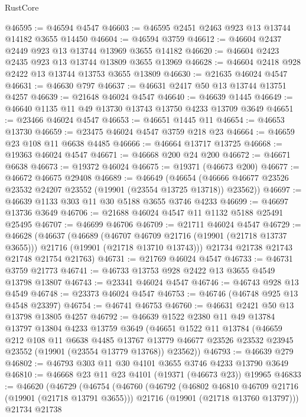 \begin{lexlean}{RustCore}
\begin{coremodule}
@46595 := @46594 @4547
@46603 := @46595 @2451 @2463 @923 @13 @13744 @14182 @3655 @14450
@46604 := @46594 @3759
@46612 := @46604 @2437 @2449 @923 @13 @13744 @13969 @3655 @14182
@46620 := @46604 @2423 @2435 @923 @13 @13744 @13809 @3655 @13969
@46628 := @46604 @2418 @928 @2422 @13 @13744 @13753 @3655 @13809
@46630 := @21635 @46024 @4547
@46631 := @46630 @797
@46637 := @46631 @2417 @50 @13 @13744 @13751 @4257
@46639 := @21648 @46024 @4547
@46640 := @46639 @1445
@46649 := @46640 @1135 @11 @49 @13730 @13743 @13750 @4233 @13709 @3649
@46651 := @23466 @46024 @4547
@46653 := @46651 @1445 @11
@46654 := @46653 @13730
@46659 := @23475 @46024 @4547 @3759 @218 @23
@46664 := @46659 @23 @108 @11 @6638 @4485
@46666 := @46664 @13717 @13725
@46668 := @19363 @46024 @4547
@46671 := @46668 @200 @24 @200
@46672 := @46671 @6638
@46673 := @19372 @46024
@46675 := @19371 (@46673 @200)
@46677 := @46672 @46675 @29408
@46689 := @46649
    (@46654 (@46666 @46677 @23526 @23532 @24207 @23552 (@19901 (@23554 @13725 @13718)) @23562))
@46697 := @46639 @1133 @303 @11 @30 @5188 @3655 @3746 @4233
@46699 := @46697 @13736 @3649
@46706 := @21688 @46024 @4547 @11 @1132 @5188 @25491 @25495
@46707 := @46699 @46706
@46709 := @21711 @46024 @4547
@46729 := @46628
    (@46637
      (@46689
        (@46707 @46709 @21716 (@19901 (@21718 @13737 @3655)))
        @21716
        (@19901 (@21718 @13710 @13743)))
      @21734
      @21738
      @21743
      @21748
      @21754
      @21763)
@46731 := @21769 @46024 @4547
@46733 := @46731 @3759 @21773
@46741 := @46733 @13753 @928 @2422 @13 @3655 @4549 @13798 @13807
@46743 := @23341 @46024 @4547
@46746 := @46743 @928 @13 @4549
@46748 := @23373 @46024 @4547
@46753 := @46746 (@46748 @925 @13 @4548 @23397)
@46754 := @46741 @46753
@46760 := @46631 @2421 @50 @13 @13798 @13805 @4257
@46792 := @46639
    @1522
    @2380
    @11
    @49
    @13784
    @13797
    @13804
    @4233
    @13759
    @3649
    (@46651
      @1522
      @11
      @13784
      (@46659
        @212
        @108
        @11
        @6638
        @4485
        @13767
        @13779
        @46677
        @23526
        @23532
        @23945
        @23552
        (@19901 (@23554 @13779 @13768))
        @23562))
@46793 := @46639 @279
@46802 := @46793 @303 @11 @30 @4101 @3655 @3746 @4233 @13790 @3649
@46810 := @46668 @23 @11 @23 @4101 (@19371 (@46673 @23)) @19965
@46833 := @46620
    (@46729
      (@46754
        (@46760
          (@46792
            (@46802 @46810 @46709 @21716 (@19901 (@21718 @13791 @3655)))
            @21716
            (@19901 (@21718 @13760 @13797)))
          @21734
          @21738

\end{coremodule}
\end{lexlean}
